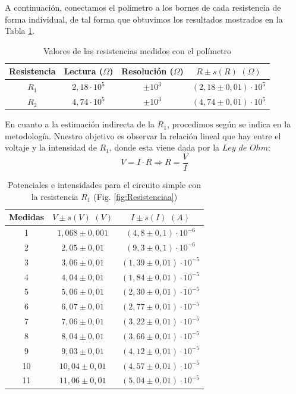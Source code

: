 \documentclass[11pt]{report}
\begin{document}
\begin{refsection}
A continuación, conectamos el polímetro a los bornes de cada resistencia de forma individual,
de tal forma que obtuvimos los resultados mostrados en la Tabla \ref{tab:R1}.

\begin{table}[H]
\centering
\begin{tabular}{|c|c|c|c|}
\hline
Resistencia & Lectura ($\Omega$) & Resolución ($\Omega$) & $R \pm s(R) \hspace{4pt} (\Omega)$\\
\hline
$R_1$ & $2,18\cdot 10^5$ & $\pm 10^3 $ & $(2,18 \pm 0,01) \cdot 10^5$\\
$R_2$ & $4,74\cdot 10^5$ & $\pm 10^3 $ & $(4,74 \pm 0,01) \cdot 10^5$\\
\hline
\end{tabular}
\caption{Valores de las resistencias medidos con el polímetro}
\label{tab:R1}
\end{table}

En cuanto a la estimación indirecta de la $R_1$, procedimos según se indica en la metodología. Nuestro objetivo es observar
la relación lineal que hay entre el voltaje y la intensidad de $R_1$, donde esta viene dada por la $Ley$ $de$ $Ohm:$
\begin{equation}
    V = I \cdot R \Rightarrow R = \frac{V}{I} 
\end{equation}

\begin{table}[H]
\centering
\begin{tabular}{|c|c|c|}
\hline
Medidas & $V \pm s(V) \hspace{4pt} (V)$ & $I \pm s(I) \hspace{4pt} (A)$ \\
\hline
1 & $1,068 \pm 0,001$ & $(4,8 \pm 0,1) \cdot 10^{-6}$ \\
2 & $2,05 \pm 0,01$ & $(9,3 \pm 0,1) \cdot 10^{-6}$ \\
3 & $3,06 \pm 0,01$ & $(1,39 \pm 0,01) \cdot 10^{-5}$ \\
4 & $4,04 \pm 0,01$ & $(1,84 \pm 0,01) \cdot 10^{-5}$ \\
5 & $5,06 \pm 0,01$ & $(2,30 \pm 0,01) \cdot 10^{-5}$ \\
6 & $6,07 \pm 0,01$ & $(2,77 \pm 0,01) \cdot 10^{-5}$ \\
7 & $7,06 \pm 0,01$ & $(3,22 \pm 0,01) \cdot 10^{-5}$ \\
8 & $8,04 \pm 0,01$ & $(3,66 \pm 0,01) \cdot 10^{-5}$ \\
9 & $9,03 \pm 0,01$ & $(4,12 \pm 0,01) \cdot 10^{-5}$ \\
10 & $10,04 \pm 0,01$ & $(4,57 \pm 0,01) \cdot 10^{-5}$ \\
11 & $11,06 \pm 0,01$ & $(5,04 \pm 0,01) \cdot 10^{-5}$ \\
\hline
\end{tabular}
\caption{Potenciales e intensidades para el circuito simple con la resistencia $R_1$ (Fig. \ref{fig:Resistenciaa})}
\label{tab:Resistencias2}
\end{table}


\end{refsection}
\end{document}
